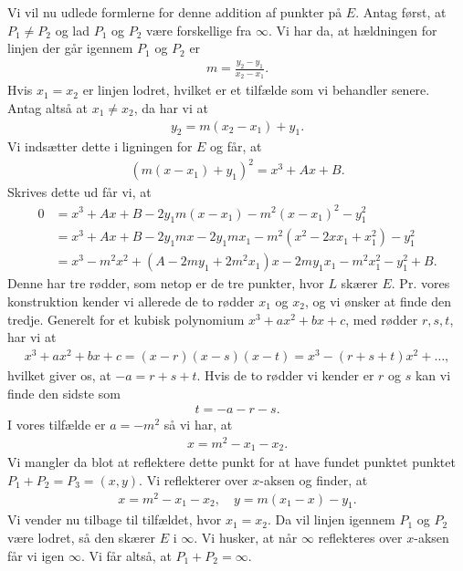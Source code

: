 Vi vil nu udlede formlerne for denne addition af punkter på $E$. Antag først, at $P_1 \neq P_2$ og lad $P_1$ og $P_2$ være forskellige fra $\infty$. Vi har da, at hældningen for linjen der går igennem $P_1$ og $P_2$ er
\begin{align*}
	m = \frac{y_2 - y_1}{x_2 - x_1}.
\end{align*}
Hvis $x_1 = x_2$ er linjen lodret, hvilket er et tilfælde som vi behandler senere. Antag altså at $x_1 \neq x_2$, da har vi at
\begin{align*}
	y_2 = m(x_2 - x_1) + y_1.
\end{align*}
Vi indsætter dette i ligningen for $E$ og får, at 
\begin{align*}
	(m(x-x_1) + y_1)^2 = x^3 + Ax + B.
\end{align*}
Skrives dette ud får vi, at
\begin{align*}
	0 &= x^3 + Ax + B - 2y_1 m(x-x_1) - m^2 (x - x_1)^2 - y_{1}^{2} \\
	&= x^3 + Ax + B - 2y_1 m x - 2y_1 m x_1 - m^2 (x^2 -2x x_1 + x_{1}^{2}) - y_{1}^{2} \\
	&= x^3 - m^2 x^2 + (A-2my_1 +2m^2x_1)x -2m y_1 x_1 -m^2 x_{1}^{2} - y_{1}^{2} + B. 
\end{align*}
Denne har tre rødder, som netop er de tre punkter, hvor $L$ skærer $E$.
Pr. vores konstruktion kender vi allerede de to rødder $x_1$ og $x_2$,
og vi ønsker at finde den tredje. Generelt for et kubisk polynomium 
$x^3 + ax^2 + bx + c$, med rødder $r, s, t$, har vi at 
\begin{align*}
	x^3 + ax^2 + bx + c = (x - r)(x - s)(x - t) = x^3 - (r + s + t)x^2 + \ldots,
\end{align*}
hvilket giver os, at $-a = r + s + t$. Hvis de to rødder vi kender er $r$ og $s$
kan vi finde den sidste som
\begin{align*}
	t = -a - r - s.
\end{align*}
I vores tilfælde er $a=-m^2$ så vi har, at 
\begin{align*}
	x = m^2 - x_1 - x_2.
\end{align*}
Vi mangler da blot at reflektere dette punkt for at have fundet punktet 
punktet $P_1 + P_2 = P_3 = (x, y)$. Vi reflekterer over $x$-aksen og finder, at 
\begin{align*}
	x = m^2 - x_1 - x_2, \quad y = m(x_1 - x) - y_1.
\end{align*}
Vi vender nu tilbage til tilfældet, hvor $x_1 = x_2$. Da vil linjen igennem 
$P_1$ og $P_2$ være lodret, så den skærer $E$ i $\infty$. Vi husker, at når $\infty$ 
reflekteres over $x$-aksen får vi igen $\infty$. Vi får altså, at $P_1 + P_2=\infty$.

